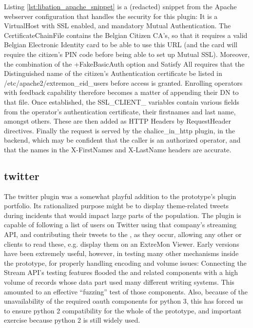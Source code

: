 Listing \ref{lst:libation_apache_snippet} is a (redacted) snippet from
the Apache webserver configuration that handles the security for this
plugin: It is a VirtualHost with SSL enabled, and mandatory Mutual
Authentication. The CertificateChainFile contains the Belgian Citizen
CA's, so that it requires a valid Belgian Electronic Identity card
to be able to use this URL (and the card will require the citizen's
PIN code before being able to set up Mutual SSL). Moreover, the
combination of the +FakeBasicAuth option and Satisfy All requires that
the Distinguished name of the citizen's Authentication certificate
be listed in \slash{}etc/apache2\slash{}extremon\_eid\_users before
access is granted. Enrolling operators with feedback capability
therefore becomes a matter of appending their DN to that file. Once
established, the SSL\_CLIENT\_ variables contain various fields from the
operator's authentication certificate, their firstnames and last name,
amongst others.  These are then added as HTTP Headers by RequestHeader
directives. Finally the request is served by the chalice\_in\_http plugin,
in the backend, which may be confident that the caller is an authorized
operator, and that the names in the X-FirstNames and X-LastName headers
are accurate.

\subsection{twitter}

The twitter plugin was a somewhat playful addition to the prototype's
plugin portfolio. Its rationalized purpose might be to display
theme-related tweets during incidents that would impact large parts of the
population. The plugin is capable of following a list of users on Twitter
using that company's streaming API, and contributing their tweets to the
\cauldron{}, as they occur, allowing any other \witches{} or \diffproto{}
clients to read these, e.g. display them on an ExtreMon Viewer. Early
versions have been extremely useful, however, in testing many other
mechanisms inside the prototype, for properly handling encoding and
volume issues: Connecting the Stream API's testing features flooded
the \cauldron{} and related components with a high volume of records
whose data part used many different writing systems. This amounted to
an effective ``fuzzing'' test of those components. Also, because of the
unavailability of the required oauth components for python 3, this has
forced us to ensure python 2 compatibility for the whole of the prototype,
and important exercise because python 2 is still widely used.

